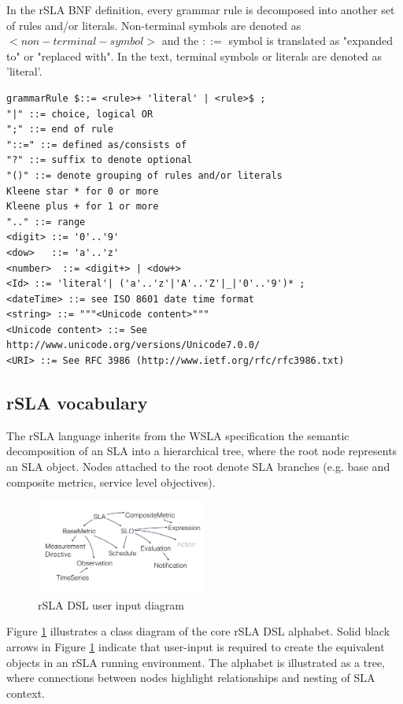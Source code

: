 \documentclass{llncs}
\begin{document}
In the rSLA BNF definition, every grammar rule is decomposed into another set of rules and/or literals. Non-terminal symbols are denoted as $<non-terminal-symbol>$ and the $::=$ symbol is translated as "expanded to" or "replaced with". In the text, terminal symbols or literals are denoted as 'literal'. 

\begin{lstlisting}[breaklines, firstnumber=auto, caption=rSLA BNF grammar rules]
grammarRule $::= <rule>+ 'literal' | <rule>$ ; 
"|" ::= choice, logical OR
";" ::= end of rule
"::=" ::= defined as/consists of
"?" ::= suffix to denote optional
"()" ::= denote grouping of rules and/or literals    
Kleene star * for 0 or more
Kleene plus + for 1 or more
".." ::= range
<digit> ::= '0'..'9'
<dow>   ::= 'a'..'z'
<number>  ::= <digit+> | <dow+>
<Id> ::= 'literal'| ('a'..'z'|'A'..'Z'|_|'0'..'9')* ;
<dateTime> ::= see ISO 8601 date time format
<string> ::= """<Unicode content>"""
<Unicode content> ::= See http://www.unicode.org/versions/Unicode7.0.0/
<URI> ::= See RFC 3986 (http://www.ietf.org/rfc/rfc3986.txt)
\end{lstlisting}

\subsection{rSLA vocabulary}
The rSLA language inherits from the WSLA specification \cite{wsla} the semantic decomposition of an SLA into a hierarchical tree, where the root node represents an SLA object. Nodes attached to the root denote SLA branches (e.g. base and composite metrics, service level objectives). 
\begin{figure}
  \centering
    \includegraphics[width=0.5\textwidth]{rslauser}
    \caption{rSLA DSL user input diagram}
    \label{rSLA_diag}
\end{figure}
Figure \ref{rSLA_diag} illustrates a class diagram of the core rSLA DSL alphabet. Solid black arrows in Figure \ref{rSLA_diag} indicate that user-input is required to create the equivalent objects in an rSLA running environment. The alphabet is illustrated as a tree, where connections between nodes highlight relationships and nesting of SLA context. 
\end{document}
